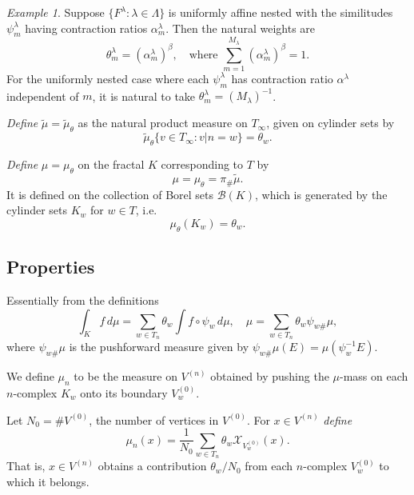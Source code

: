 \documentclass[a4paper]{amsart}
\theoremstyle{plain}
\theoremstyle{definition}
\theoremstyle{remark}
\newtheorem{example}[theorem]{Example}
\begin{document}
\begin{example}  Suppose $\{ F^\lambda : \lambda \in \Lambda \} $ is uniformly affine nested with the similitudes $\psi_m^ \lambda $  having contraction ratios $ \alpha _m ^ \lambda $. Then the natural weights are 
  \[
  \theta_m^ \lambda = ( \alpha _m ^ \lambda )^ \beta,   \quad \text{where } 
                \sum_{m=1}^{M_\lambda}  ( \alpha _m ^ \lambda )^ \beta = 1.
                \]
 For the uniformly nested case where each $ \psi^ \lambda _m $ has contraction ratio $ \alpha ^ \lambda $  independent of $ m $, it is natural to take $ \theta_m^ \lambda = (M_ \lambda )^{-1} $.
 
  \bigskip
 \emph{Define}  $\widetilde{\mu} =  \widetilde{\mu}_\theta $ as the natural product measure on $ T_\infty $,  given on cylinder sets by
 \[   \widetilde{\mu}_\theta \{ v \in T_\infty : v|n = w \} = \theta_{w}. \]
 
 \emph{Define} $ \mu = \mu_\theta $ on the fractal $ K $ corresponding to $ T $  by
 \[ \mu = \mu_\theta = \pi_{\#} \widetilde{\mu}. \]
 It is defined on the collection of Borel sets $ \mathcal{B}(K) $, which is generated by the cylinder sets $  K_w $ for $ w \in T  $, i.e.
 \[   \mu_\theta (K_w) = \theta_w . \]
 \end{example} 
 
\subsection{Properties} 
Essentially from the definitions
 \begin{equation} \label{} 
  \int_Kf\, d\mu  = \sum_{w\in T_n} \theta_w \int f \circ \psi_w\, d \mu, \quad 
 \mu  = \sum_{w\in T_n} \theta_w \psi_{w\#} \mu,
\end{equation}
 where $  \psi_{w\#} \mu $ is the pushforward  measure given by
 $   \psi_{w\#} \mu (E) = \mu( \psi_w^{-1} E) $.
 
 \bigskip  We define $ \mu_n $ to be the measure on $ V^{(n)} $ obtained by pushing the $ \mu $-mass on each $ n $-complex $ K_w $ onto its boundary $ V_w^{(0)} $.  

Let $ N_0 = \# V^{(0)} $, the number of vertices in $ V^{(0)} $. For $ x \in V^{(n)} $  \emph{define}
\begin{equation} \label{}
  \mu_n(x) = \frac{1}{N_0} \sum_{w\in T_n} \theta_w  \mathcal{X}_{V_w^{(0)}}(x) .
\end{equation} 
That is, $ x \in V^{(n)} $ obtains a contribution $ \theta _w/N_0 $ from each $ n $-complex $ V_w^{(0)} $ to which it belongs.
\end{document}
